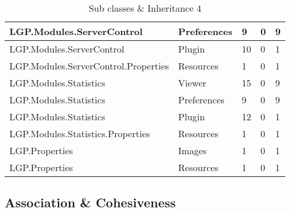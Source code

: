 \begin{table}[h!t]
{\begin{tabular}{ | p{82mm} | p{33mm} | p{10mm} | p{10mm} | p{10mm}  | }
				LGP.Modules.ServerControl & Preferences & 9     & 0     & 9  \\ \hline
				LGP.Modules.ServerControl & Plugin & 10    & 0     & 1  \\ \hline
				LGP.Modules.ServerControl.Properties & Resources & 1     & 0     & 1  \\ \hline
				LGP.Modules.Statistics & Viewer & 15    & 0     & 9  \\ \hline
				LGP.Modules.Statistics & Preferences & 9     & 0     & 9  \\ \hline
				LGP.Modules.Statistics & Plugin & 12    & 0     & 1  \\ \hline
				LGP.Modules.Statistics.Properties & Resources & 1     & 0     & 1  \\ \hline
				LGP.Properties & Images & 1     & 0     & 1  \\ \hline
				LGP.Properties & Resources & 1     & 0     & 1  \\ \hline
				\end{tabular}}
				
				\caption{Sub classes \& Inheritance 4}			
				\label{tab:SubclassesInheritance4}
				
			\end{table}
	
		\newpage	
			
		\subsection{Association \& Cohesiveness}	
		\label{sec:AssociationCohesiveness}
			
